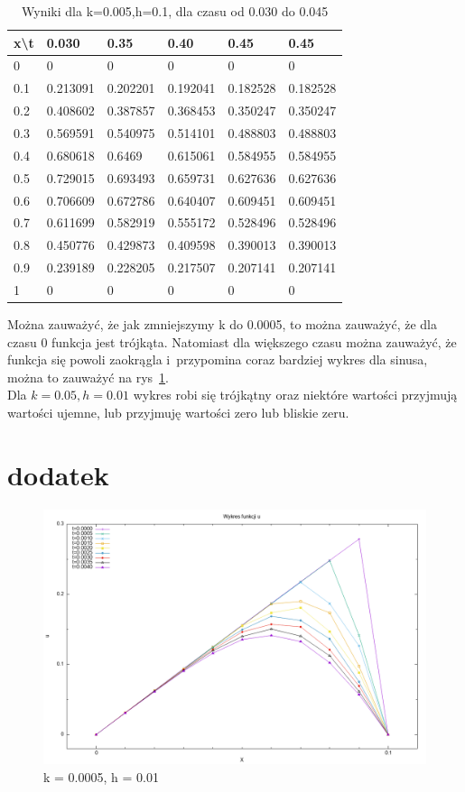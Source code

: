 \documentclass[10pt, a4paper]{article}
\begin{document}
\begin{table}[]
	\begin{tabular}{|l|l|l|l|l|l|}
		\hline
		x\textbackslash{}t & 0.030    & 0.35     & 0.40     & 0.45     & 0.45     \\ \hline
		0                  & 0        & 0        & 0        & 0        & 0        \\ \hline
		0.1                & 0.213091 & 0.202201 & 0.192041 & 0.182528 & 0.182528 \\ \hline
		0.2                & 0.408602 & 0.387857 & 0.368453 & 0.350247 & 0.350247 \\ \hline
		0.3                & 0.569591 & 0.540975 & 0.514101 & 0.488803 & 0.488803 \\ \hline
		0.4                & 0.680618 & 0.6469   & 0.615061 & 0.584955 & 0.584955 \\ \hline
		0.5                & 0.729015 & 0.693493 & 0.659731 & 0.627636 & 0.627636 \\ \hline
		0.6                & 0.706609 & 0.672786 & 0.640407 & 0.609451 & 0.609451 \\ \hline
		0.7                & 0.611699 & 0.582919 & 0.555172 & 0.528496 & 0.528496 \\ \hline
		0.8                & 0.450776 & 0.429873 & 0.409598 & 0.390013 & 0.390013 \\ \hline
		0.9                & 0.239189 & 0.228205 & 0.217507 & 0.207141 & 0.207141 \\ \hline
		1                  & 0        & 0        & 0        & 0        & 0        \\ \hline
	\end{tabular}
		\caption{Wyniki dla k=0.005,h=0.1, dla czasu od 0.030 do 0.045}
	\label{tab2}
\end{table}
Można zauważyć, że jak zmniejszymy k do 0.0005, to można zauważyć, że dla czasu 0 funkcja jest trójkąta. Natomiast dla większego czasu można zauważyć, że funkcja się powoli zaokrągla i~przypomina coraz bardziej wykres dla sinusa, można to zauważyć na rys~\ref{wyk2}. \\
Dla $k = 0.05, h = 0.01$ wykres robi się trójkątny oraz niektóre wartości przyjmują wartości ujemne, lub przyjmuję wartości zero lub bliskie zeru. 
\section{dodatek}
\begin{figure}
	\centering
	\includegraphics[width=0.7\linewidth]{"wykresy dla u(x,t)2"}
	\caption{k = 0.0005, h = 0.01}
	\label{wyk2}
\end{figure}
\end{document}
